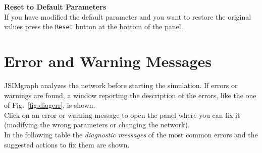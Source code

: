 \noindent \textbf{Reset to Default Parameters}\\
 If you have modified the
default parameter and you want to restore the original values
press the \texttt{Reset} button at the bottom of the panel.


\section{Error and Warning Messages}
\label{erwar}

JSIMgraph analyzes the network before starting the simulation. If
errors or warnings are found, a window reporting the description
of the errors, like the one of Fig.~\ref{fig:diagerr}, is shown.\\
Click on an error or warning message to open the panel where you
can fix it (modifying the wrong parameters or changing the network).\\
In the following table the \emph{diagnostic messages} of the most
common errors and the suggested actions to fix them are shown.

\pagebreak


